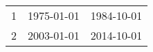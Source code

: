 % 
\begin{tabular}{ccc}
  \hline
  \hline
1 & 1975-01-01 & 1984-10-01 \\ 
  2 & 2003-01-01 & 2014-10-01 \\ 
   \hline
\end{tabular}
